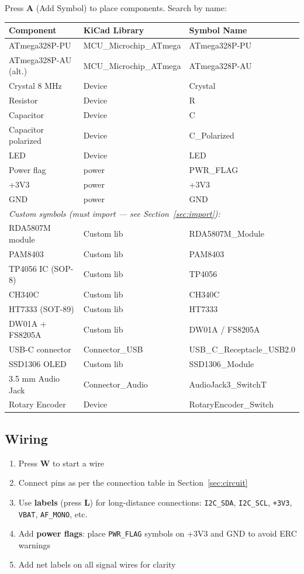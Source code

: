 \documentclass[a4paper,11pt]{article}
\renewcommand*{\,}{ }%
\begin{document}
Press \textbf{A} (Add Symbol) to place components. Search by name:

\begin{longtable}{@{}p{5cm}p{4cm}p{4cm}@{}}
\toprule
\textbf{Component} & \textbf{KiCad Library} & \textbf{Symbol Name} \\
\midrule
\endhead
ATmega328P-PU & MCU\_Microchip\_ATmega & ATmega328P-PU \\
ATmega328P-AU (alt.) & MCU\_Microchip\_ATmega & ATmega328P-AU \\
Crystal 8\,MHz & Device & Crystal \\
Resistor & Device & R \\
Capacitor & Device & C \\
Capacitor polarized & Device & C\_Polarized \\
LED & Device & LED \\
Power flag & power & PWR\_FLAG \\
+3V3 & power & +3V3 \\
GND & power & GND \\
\midrule
\multicolumn{3}{l}{\textit{Custom symbols (must import --- see Section~\ref{sec:import}):}} \\
RDA5807M module & Custom lib & RDA5807M\_Module \\
PAM8403 & Custom lib & PAM8403 \\
TP4056 IC (SOP-8) & Custom lib & TP4056 \\
CH340C & Custom lib & CH340C \\
HT7333 (SOT-89) & Custom lib & HT7333 \\
DW01A + FS8205A & Custom lib & DW01A / FS8205A \\
USB-C connector & Connector\_USB & USB\_C\_Receptacle\_USB2.0 \\
SSD1306 OLED & Custom lib & SSD1306\_Module \\
3.5\,mm Audio Jack & Connector\_Audio & AudioJack3\_SwitchT \\
Rotary Encoder & Device & RotaryEncoder\_Switch \\
\bottomrule
\end{longtable}

\subsection{Wiring}

\begin{enumerate}
    \item Press \textbf{W} to start a wire
    \item Connect pins as per the connection table in Section~\ref{sec:circuit}
    \item Use \textbf{labels} (press \textbf{L}) for long-distance connections: \texttt{I2C\_SDA}, \texttt{I2C\_SCL}, \texttt{+3V3}, \texttt{VBAT}, \texttt{AF\_MONO}, etc.
    \item Add \textbf{power flags}: place \texttt{PWR\_FLAG} symbols on +3V3 and GND to avoid ERC warnings
    \item Add net labels on all signal wires for clarity
\end{enumerate}
\end{document}
